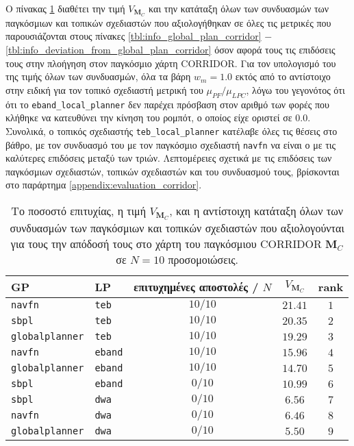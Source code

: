 Ο πίνακας \ref{tbl:rank_corridor} διαθέτει την τιμή $V_{\bm{M}_C}$ και την κατάταξη όλων των
συνδυασμών των παγκόσμιων και τοπικών σχεδιαστών που αξιολογήθηκαν σε όλες τις μετρικές
που παρουσιάζονται στους πίνακες \ref{tbl:info_global_plan_corridor} $-$
\ref{tbl:info_deviation_from_global_plan_corridor} όσον αφορά τους
τις επιδόσεις τους στην πλοήγηση στον παγκόσμιο χάρτη CORRIDOR. Για τον υπολογισμό του
της τιμής όλων των συνδυασμών, όλα τα βάρη $w_m = 1.0$ εκτός από το αντίστοιχο
στην ειδική για τον τοπικό σχεδιαστή μετρική του $\mu_{PF} / \mu_{LPC}$, λόγω του γεγονότος ότι
ότι το \texttt{eband\_local\_planner} δεν παρέχει πρόσβαση στον αριθμό των
φορές που κλήθηκε να κατευθύνει την κίνηση του ρομπότ, ο οποίος είχε οριστεί σε $0.0$.
Συνολικά, ο τοπικός σχεδιαστής \texttt{teb\_local\_planner} κατέλαβε όλες τις θέσεις στο βάθρο,
με τον συνδυασμό του με τον παγκόσμιο σχεδιαστή \texttt{navfn} να είναι ο
με τις καλύτερες επιδόσεις μεταξύ των τριών. Λεπτομέρειες σχετικά με τις επιδόσεις των παγκόσμιων σχεδιαστών,
τοπικών σχεδιαστών και του συνδυασμού τους, βρίσκονται στο παράρτημα
\ref{appendix:evaluation_corridor}.

\begin{table}[htb]\centering
\renewcommand{\arraystretch}{1.3}
\begin{tabular}{llccc}
  GP & LP & επιτυχημένες αποστολές / $N$ & $V_{\bm{M}_C}$ & rank \\ \toprule
  \texttt{navfn} & \texttt{teb} & $10/10$ & $21.41$ & $1$ \\
  \texttt{sbpl} & \texttt{teb} & $10/10$ & $20.35$ & $2$ \\
  \texttt{globalplanner} & \texttt{teb} & $10/10$ & $19.29$ & $3$ \\
  \texttt{navfn} & \texttt{eband} & $10/10$ & $15.96$ & $4$ \\
  \texttt{globalplanner} & \texttt{eband} & $10/10$ & $14.70$ & $5$ \\
  \texttt{sbpl} & \texttt{eband} & $0/10$ & $10.99$ & $6$ \\
  \texttt{sbpl} & \texttt{dwa} & $0/10$ & $6.56$ & $7$ \\
  \texttt{navfn} & \texttt{dwa} & $0/10$ & $6.46$ & $8$ \\
  \texttt{globalplanner} & \texttt{dwa} & $0/10$ & $5.50$ & $9$ \\ \bottomrule
\end{tabular}
\caption{Το ποσοστό επιτυχίας, η τιμή $V_{\bm{M}_C}$, και η αντίστοιχη κατάταξη όλων των
         συνδυασμών των παγκόσμιων και τοπικών σχεδιαστών που αξιολογούνται για τους
         την απόδοσή τους στο χάρτη του παγκόσμιου CORRIDOR $\bm{M}_C$ σε $N=10$
         προσομοιώσεις.}
\label{tbl:rank_corridor}
\end{table}


